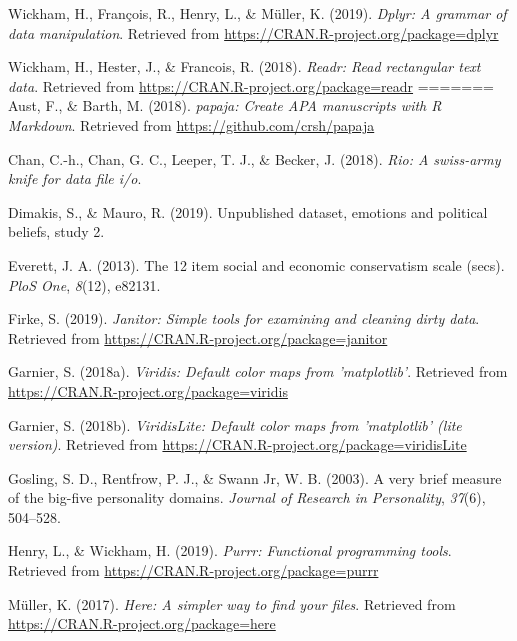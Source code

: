\documentclass[man]{apa6}
\begin{document}
\hypertarget{ref-R-dplyr}{}
Wickham, H., François, R., Henry, L., \& Müller, K. (2019). \emph{Dplyr:
A grammar of data manipulation}. Retrieved from
\url{https://CRAN.R-project.org/package=dplyr}

\hypertarget{ref-R-readr}{}
Wickham, H., Hester, J., \& Francois, R. (2018). \emph{Readr: Read
rectangular text data}. Retrieved from
\url{https://CRAN.R-project.org/package=readr}
=======
\leavevmode\hypertarget{ref-R-papaja}{}%
Aust, F., \& Barth, M. (2018). \emph{papaja: Create APA manuscripts with R Markdown}. Retrieved from \url{https://github.com/crsh/papaja}

\leavevmode\hypertarget{ref-R-rio}{}%
Chan, C.-h., Chan, G. C., Leeper, T. J., \& Becker, J. (2018). \emph{Rio: A swiss-army knife for data file i/o}.

\leavevmode\hypertarget{ref-Dimakis_Mauro_2019}{}%
Dimakis, S., \& Mauro, R. (2019). Unpublished dataset, emotions and political beliefs, study 2.

\leavevmode\hypertarget{ref-everett201312}{}%
Everett, J. A. (2013). The 12 item social and economic conservatism scale (secs). \emph{PloS One}, \emph{8}(12), e82131.

\leavevmode\hypertarget{ref-R-janitor}{}%
Firke, S. (2019). \emph{Janitor: Simple tools for examining and cleaning dirty data}. Retrieved from \url{https://CRAN.R-project.org/package=janitor}

\leavevmode\hypertarget{ref-R-viridis}{}%
Garnier, S. (2018a). \emph{Viridis: Default color maps from 'matplotlib'}. Retrieved from \url{https://CRAN.R-project.org/package=viridis}

\leavevmode\hypertarget{ref-R-viridisLite}{}%
Garnier, S. (2018b). \emph{ViridisLite: Default color maps from 'matplotlib' (lite version)}. Retrieved from \url{https://CRAN.R-project.org/package=viridisLite}

\leavevmode\hypertarget{ref-gosling2003very}{}%
Gosling, S. D., Rentfrow, P. J., \& Swann Jr, W. B. (2003). A very brief measure of the big-five personality domains. \emph{Journal of Research in Personality}, \emph{37}(6), 504--528.

\leavevmode\hypertarget{ref-R-purrr}{}%
Henry, L., \& Wickham, H. (2019). \emph{Purrr: Functional programming tools}. Retrieved from \url{https://CRAN.R-project.org/package=purrr}

\leavevmode\hypertarget{ref-R-here}{}%
Müller, K. (2017). \emph{Here: A simpler way to find your files}. Retrieved from \url{https://CRAN.R-project.org/package=here}
\end{document}
